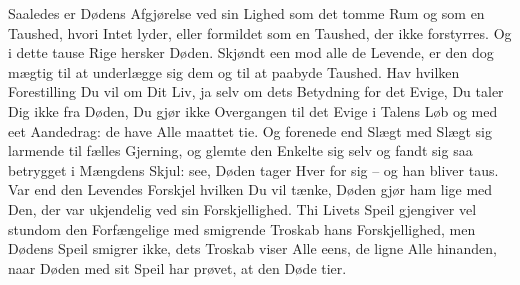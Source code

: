 \documentclass[12pt,a4paper]{article}
\begin{document}
Saaledes er Dødens Afgjørelse ved sin Lighed som det tomme Rum og som en Taushed, hvori Intet lyder, eller formildet som en Taushed, der ikke forstyrres. Og i dette tause Rige hersker Døden. Skjøndt een mod alle de Levende, er den dog mægtig til at underlægge sig dem og til at paabyde Taushed. Hav hvilken Forestilling Du vil om Dit Liv, ja selv om dets Betydning for det Evige, Du taler Dig ikke fra Døden, Du gjør ikke Overgangen til det Evige i Talens Løb og med eet Aandedrag: de have Alle maattet tie. Og forenede end Slægt med Slægt sig larmende til fælles Gjerning, og glemte den Enkelte sig selv og fandt sig saa betrygget i Mængdens Skjul: see, Døden tager Hver for sig – og han bliver taus. Var end den Levendes Forskjel hvilken Du vil tænke, Døden gjør ham lige med Den, der var ukjendelig ved sin Forskjellighed. Thi Livets Speil gjengiver vel stundom den Forfængelige med smigrende Troskab hans Forskjellighed, men Dødens Speil smigrer ikke, dets Troskab viser Alle eens, de ligne Alle hinanden, naar Døden med sit Speil har prøvet, at den Døde tier.
\end{document}

